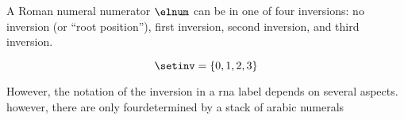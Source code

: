 
A Roman numeral numerator $\elnum$ can be in one of four
inversions: no inversion (or ``root position''), first
inversion, second inversion, and third inversion.

\begin{equation}
    \label{eq:inversion_vocabulary}
    \setinv = \{ 0, 1, 2, 3 \}
\end{equation}


However, the notation of the inversion in a \gls{rna} label
depends on several aspects. however, there are only
fourdetermined by a stack of arabic numerals

\begin{equation}
    \label{eq:inversion}
\end{equation}
